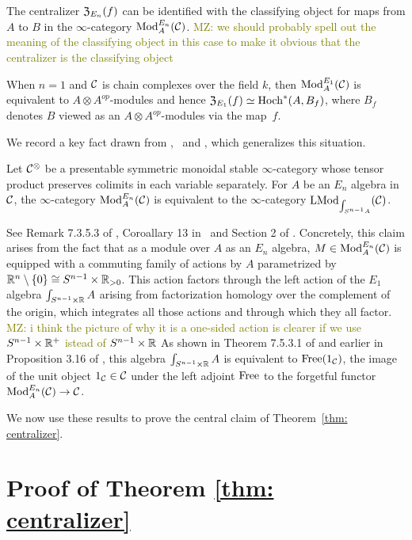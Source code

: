 \documentclass[11pt]{amsart}
\numberwithin{equation}{section}
\def\mahmoud{\textcolor{olive}{MZ: }\textcolor{olive}}
\begin{document}
\begin{prp}
The centralizer ${\frak Z}_{E_n}(f)$ can be identified with the classifying object for maps from $A$ to $B$ in the $\infty$-category ${\rm Mod}^{E_n}_A(\mathcal C)$. \mahmoud{we should probably spell out the meaning of the classifying object in this case to make it obvious that the centralizer is the classifying object}
\end{prp} 

When $n=1$ and $\mathcal C$ is chain complexes over the field $k$, then ${\rm Mod}^{E_1}_A(\mathcal C)$ is equivalent to $A\otimes A^{op}$-modules and hence ${\frak Z}_{E_1}(f) \simeq {\rm Hoch}^*(A,B_f)$,
where $B_f$ denotes $B$ viewed as an $A\otimes A^{op}$-modules via the map~$f$.

We record a key fact drawn from \cite{LurieHA},~\cite{FrancisHH}  and \cite{GG-Notes}, which generalizes this situation.

\begin{prp}
Let $\mathcal C^\otimes$ be a presentable symmetric monoidal stable $\infty$-category whose tensor product preserves colimits in each variable separately.
For $A$ be an $E_n$ algebra in $\mathcal C$,
the $\infty$-category ${\rm Mod}^{E_n}_A(\mathcal C)$ is equivalent to the $\infty$-category ${\rm LMod}_{\int_{S^{n-1} A}}(\mathcal C)$.
\end{prp}

See Remark 7.3.5.3 of \cite{LurieHA}, Coroallary 13 in~\cite{GG-Notes} and Section 2 of \cite{FrancisHH}.
Concretely, this claim arises from the fact that as a module over $A$ as an $E_n$ algebra, 
$M \in {\rm Mod}^{E_n}_A(\mathcal C)$ is equipped with a commuting family of actions by $A$ parametrized by $\mathbb R^n \setminus \{0\}\cong S^{n-1} \times \mathbb R_{>0}$.
This action factors through the left action of the $E_1$ algebra $\int_{S^{n-1} \times \mathbb R} A$ arising from factorization homology over the complement of the origin,
which integrates all those actions and through which they all factor. \mahmoud{i think the picture of why it is a one-sided action is clearer if we use $S^{n-1} \times \mathbb R^+$ istead of $S^{n-1} \times \mathbb R$}
As shown in Theorem 7.5.3.1 of \cite{LurieHA} and earlier in Proposition 3.16 of \cite{FrancisHH}, 
this algebra $\int_{S^{n-1} \times \mathbb R} A$ is equivalent to ${\rm Free}(1_\mathcal C)$, 
the image of the unit object $1_\mathcal C \in \mathcal C$ under the left adjoint ${\rm Free}$ to the forgetful functor ${\rm Mod}^{E_n}_A(\mathcal C) \to \mathcal C$.

We now use these results to prove the central claim of Theorem~\ref{thm: centralizer}.

\section{Proof of Theorem \ref{thm: centralizer}}
\end{document}
